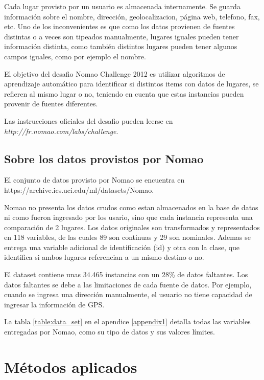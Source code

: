 \documentclass[journal]{IEEEtran}
\begin{document}
Cada lugar provisto por un usuario es almacenada internamente. Se guarda
información sobre el nombre, dirección, geolocalizacion, página web,
telefono, fax, etc. Uno de los inconvenientes es que como los datos
provienen de fuentes distintas o a veces son tipeados manualmente,
lugares iguales pueden tener información distinta, como también
distintos lugares pueden tener algunos campos iguales, como por 
ejemplo el nombre.

El objetivo del desafio Nomao Challenge 2012 es utilizar 
algoritmos de aprendizaje automático para identificar si 
distintos items con datos de lugares, se refieren al mismo
lugar o no, teniendo en cuenta que estas instancias
pueden provenir de fuentes diferentes.

Las instrucciones oficiales del desafio pueden leerse en 
\textit{http://fr.nomao.com/labs/challenge}.

\subsection{Sobre los datos provistos por Nomao}

El conjunto de datos provisto por Nomao se encuentra en
https://archive.ics.uci.edu/ml/datasets/Nomao. 

Nomao no presenta los datos crudos como estan almacenados en la 
base de datos ni como fueron ingresado por los usario, sino que  
cada instancia representa una comparación de 
2 lugares. Los datos originales son transformados y representados
en 118 variables, de las cuales 89 son continuas y 29 son
nominales. Ademas se entrega una variable adicional de identificación (id) y
otra con la clase, que identifica si ambos lugares referencian a un mismo
destino o no. 

El dataset contiene unas 34.465 instancias con un 28\% de datos faltantes.
Los datos faltantes se debe a las limitaciones de cada fuente de datos. Por
ejemplo, cuando se ingresa una dirección manualmente, el usuario no tiene
capacidad de ingresar la información de GPS.

La tabla \ref{table:data_set} en el apendice \ref{appendix1} detalla todas las variables entregadas por 
Nomao, como su tipo de datos y sus valores límites.


\section{Métodos aplicados}
\end{document}
